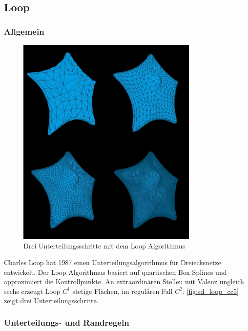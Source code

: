 \subsection{Loop} \label{subsec:loop}

\subsubsection*{Allgemein}

\begin{figure}
\centering
\includegraphics[width=0.8\textwidth]{content/media/cc5_edge_loop.jpg}
\caption{Drei Unterteilungsschritte mit dem Loop Algorithmus}
\label{fig:sd_loop_cc5}
\end{figure}

Charles Loop hat 1987 einen Unterteilungsalgorithmus für Dreiecksnetze entwickelt.
Der Loop Algorithmus basiert auf quartischen Box Splines und approximiert die Kontrollpunkte.
An extraordinären Stellen mit Valenz ungleich sechs erzeugt Loop \(C^1\) stetige Flächen,
im regulären Fall \(C^2\).
\autoref{fig:sd_loop_cc5} zeigt drei Unterteilungsschritte.
\cite[S. 70 f.]{Zorin.subdivcourse} \cite[S. 56 f.]{Standford.24.07.2015}

\subsubsection*{Unterteilungs- und Randregeln}


